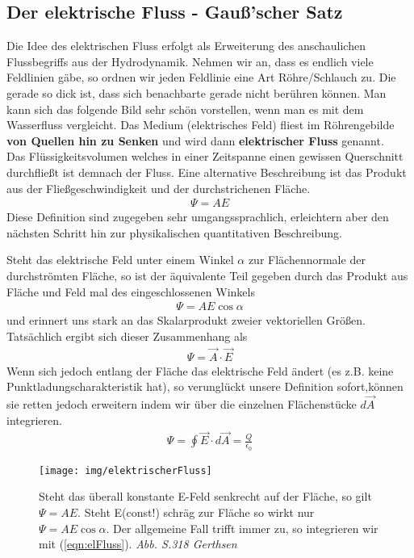 \subsection{Der elektrische Fluss - Gauß'scher Satz} \label{sec:elFluss}
Die Idee des elektrischen Fluss erfolgt als Erweiterung des anschaulichen Flussbegriffs aus der Hydrodynamik. Nehmen wir an, dass es endlich viele Feldlinien gäbe, so ordnen wir jeden Feldlinie eine Art Röhre/Schlauch zu. Die gerade so dick ist, dass sich benachbarte gerade nicht berühren können. Man kann sich das folgende Bild sehr schön vorstellen, wenn man es mit dem Wasserfluss vergleicht. Das Medium (elektrisches Feld)  fliest im Röhrengebilde  \textbf{von Quellen hin zu Senken} und wird dann \textbf{elektrischer Fluss} genannt.\\ Das Flüssigkeitsvolumen welches in einer Zeitspanne einen gewissen Querschnitt durchfließt ist demnach der Fluss. Eine alternative Beschreibung ist das Produkt aus der Fließgeschwindigkeit und der durchstrichenen Fläche.\begin{align}
\Psi = AE
\end{align}Diese Definition sind zugegeben sehr umgangssprachlich, erleichtern aber den nächsten Schritt hin zur physikalischen quantitativen Beschreibung. \par 
Steht das elektrische Feld unter einem Winkel $\alpha$ zur Flächennormale der durchströmten Fläche, so ist der äquivalente Teil gegeben durch das Produkt aus Fläche und Feld mal des eingeschlossenen Winkels\begin{align}
\Psi = AE\cos \alpha
\end{align}und erinnert uns stark an das Skalarprodukt zweier vektoriellen Größen. Tatsächlich ergibt sich dieser Zusammenhang als\begin{align}
\Psi = \vec{A} \cdot \vec{E}
\end{align} Wenn sich jedoch entlang der Fläche das elektrische Feld ändert (es z.B. keine Punktladungscharakteristik hat), so verunglückt unsere Definition sofort,können sie retten  jedoch erweitern indem wir über die einzelnen Flächenstücke $d\vec{A}$ integrieren.\begin{align}
\boxed{\Psi = \oint \vec{E} \cdot d\vec{A} = \frac{Q}{\epsilon_0}} \label{eqn:elFluss}
\end{align}

\begin{figure}
\begin{center}\texttt{[image: img/elektrischerFluss]}\end{center}
\caption{Steht das überall konstante E-Feld senkrecht auf der Fläche, so gilt \mbox{$\Psi = AE$}. Steht E(const!) schräg zur Fläche so wirkt nur $\Psi = AE\cos \alpha$. Der allgemeine Fall trifft immer zu, so integrieren wir mit (\ref{eqn:elFluss}). \textit{Abb. S.318 Gerthsen} }
\label{pic:elFluss}
\end{figure}
